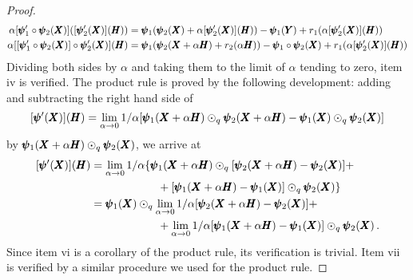 {\begin{proof}
\begin{align*}
	\alpha[\pmb{\psi}'_1\circ\pmb{\psi}_2(\pmb{X})]([\pmb{\psi}'_2(\pmb{X})](\pmb{H}))&=\pmb{\psi}_1(\pmb{\psi}_2(\pmb{X})+\alpha[\pmb{\psi}'_2(\pmb{X})](\pmb{H}))-\pmb{\psi}_1(\pmb{Y})+r_1(\alpha[\pmb{\psi}'_2(\pmb{X})](\pmb{H}))\\
	\alpha[[\pmb{\psi}_1'\circ\pmb{\psi}_2(\pmb{X})]\circ\pmb{\psi}_2'(\pmb{X})](\pmb{H})&=\pmb{\psi}_1(\pmb{\psi}_2(\pmb{X}+\alpha\pmb{H})+r_2(\alpha\pmb{H}))-\pmb{\psi}_1\circ\pmb{\psi}_2(\pmb{X})+r_1(\alpha[\pmb{\psi}'_2(\pmb{X})](\pmb{H}))
\end{align*}
Dividing both sides by $\alpha$ and taking them to the limit of $\alpha$ tending to zero, item iv is verified. The product rule is proved by the following development: adding and subtracting the right hand side of
\begin{equation*}
[\pmb{\psi}'(\pmb{X})](\pmb{H})=\lim_{\alpha\to 0}1/\alpha[\pmb{\psi}_1(\pmb{X}+\alpha\pmb{H})\odot_q\pmb{\psi}_2(\pmb{X}+\alpha\pmb{H})-\pmb{\psi}_1(\pmb{X})\odot_q\pmb{\psi}_2(\pmb{X})]
\end{equation*}
by $\pmb{\psi}_1(\pmb{X}+\alpha\pmb{H})\odot_{q}\pmb{\psi}_2(\pmb{X})$, we arrive at
\begin{align*}
[\pmb{\psi}'(\pmb{X})](\pmb{H})&=\lim_{\alpha\to 0}1/\alpha\{ \pmb{\psi}_1(\pmb{X}+\alpha\pmb{H})\odot_{q}[\pmb{\psi}_2(\pmb{X}+\alpha\pmb{H})-\pmb{\psi}_2(\pmb{X})] +\\
& \qquad\qquad\qquad+[\pmb{\psi}_1(\pmb{X}+\alpha\pmb{H})-\pmb{\psi}_1(\pmb{X})]\odot_q\pmb{\psi}_2(\pmb{X})\}\\
&= \pmb{\psi}_1(\pmb{X})\odot_{q}\lim_{\alpha\to 0}1/\alpha[\pmb{\psi}_2(\pmb{X}+\alpha\pmb{H})-\pmb{\psi}_2(\pmb{X})] +\\
& \qquad\qquad\qquad+\lim_{\alpha\to 0}1/\alpha[\pmb{\psi}_1(\pmb{X}+\alpha\pmb{H})-\pmb{\psi}_1(\pmb{X})]\odot_q\pmb{\psi}_2(\pmb{X})\,.
\end{align*}
Since item vi is a corollary of the product rule, its verification is trivial. Item vii is verified by a similar procedure we used for the product rule. 
\end{proof}}

